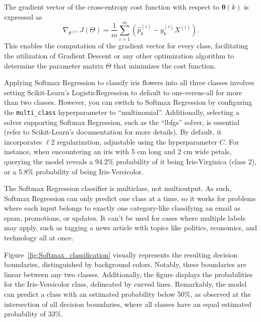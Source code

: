 \documentclass[12pt,letter]{article}
\begin{document}
The gradient vector of the cross-entropy cost function with respect to $\pmb{\theta}(k)$ is expressed as
\begin{equation}
\nabla_{\theta^{(k)}}J(\Theta) = \frac{1}{m} \sum_{i=1}^{m} (\hat{p}_k^{(i)}-y_k^{(i)} X^{(i)}).
\end{equation}
This enables the computation of the gradient vector for every class, facilitating the utilization of Gradient Descent or any other optimization algorithm to determine the parameter matrix $\Theta$ that minimizes the cost function.

Applying Softmax Regression to classify iris flowers into all three classes involves setting Scikit-Learn's LogisticRegression to default to one-versus-all for more than two classes. However, you can switch to Softmax Regression by configuring the \texttt{multi\_class} hyperparameter to ``multinomial''. Additionally, selecting a solver supporting Softmax Regression, such as the ``lbfgs'' solver, is essential (refer to Scikit-Learn's documentation for more details). By default, it incorporates $\ell$2 regularization, adjustable using the hyperparameter $C$. For instance, when encountering an iris with 5 cm long and 2 cm wide petals, querying the model reveals a 94.2\% probability of it being Iris-Virginica (class 2), or a 5.8\% probability of being Iris-Versicolor.


\begin{mdframed}[middlelinewidth=0.5mm]
\begin{center}
\end{center}
The Softmax Regression classifier is multiclass, not multioutput. As such, Softmax Regression can only predict one class at a time, so it works for problems where each input belongs to exactly one category-like classifying an email as spam, promotions, or updates. It can't be used for cases where multiple labels may apply, such as tagging a news article with topics like politics, economics, and technology all at once.
\end{mdframed}


Figure~\ref{fig:Softmax_classification} visually represents the resulting decision boundaries, distinguished by background colors. Notably, these boundaries are linear between any two classes. Additionally, the figure displays the probabilities for the Iris-Versicolor class, delineated by curved lines. Remarkably, the model can predict a class with an estimated probability below 50\%, as observed at the intersection of all decision boundaries, where all classes have an equal estimated probability of 33\%.
\end{document}
